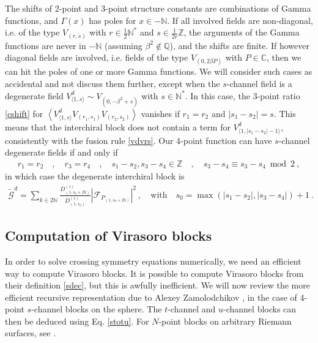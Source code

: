 \documentclass[12pt, a4paper]{article}
\theoremstyle{break}
\begin{document}
The shifts of 2-point and 3-point structure constants are combinations of Gamma functions, and $\Gamma(x)$ has poles for $x\in -\mathbb{N}$.
If all involved fields are non-diagonal, i.e. of the type $V_{(r,s)}$ with $r\in\frac12\mathbb{N}^*$ and $s\in\frac{1}{2r}\mathbb{Z}$, the arguments of the Gamma functions are never in $-\mathbb{N}$ (assuming $\beta^2\notin \mathbb{Q}$), and the shifts are finite. If however diagonal fields are involved, i.e. fields of the type $V_{(0,2\beta P)}$ with $P\in \mathbb{C}$, then we can hit the poles of one or more Gamma functions. We will consider such cases as accidental and not discuss them further, except when the $s$-channel field is a degenerate field $V^d_{\langle 1,s\rangle}\sim V_{(0,-\beta^2+s)}$ with $s\in\mathbb{N}^*$. 
In this case, the 3-point ratio \eqref{cshift} for $\left<V^d_{\langle 1,s\rangle}V_{(r_1,s_1)}V_{(r_2,s_2)}\right>$ vanishes if $r_1=r_2$ and $|s_1-s_2|=s$. This means that the interchiral block does not contain a term for $V^d_{\langle 1,|s_1-s_2|-1\rangle}$, consistently with the fusion rule \eqref{vdvrs}. Our 4-point function can have $s$-channel degenerate fields if and only if 
\begin{align}
 r_1=r_2 \quad , \quad r_3=r_4 \quad , \quad s_1-s_2,s_3-s_4\in \mathbb{Z} \quad , \quad s_3-s_4\equiv s_3-s_4\bmod 2\ , 
\end{align}
in which case the degenerate interchiral block is 
\begin{align}
 \widetilde{\mathcal{G}}^d = \sum_{k\in 2\mathbb{N}} \frac{D^{(s)}_{(1,s_0+2k)}}{D^{(s)}_{(1,s_0)}}\left| \mathcal{F}_{P_{(1,s_0+2k)}} \right|^2\ ,  \quad \text{with} \quad s_0 =  \max(|s_1-s_2|,|s_3-s_4|)+1\ . 
\end{align}

\subsection{Computation of Virasoro blocks}

In order to solve crossing symmetry equations numerically, we need an efficient way to compute Virasoro blocks. It is possible to compute Virasoro blocks from their definition \eqref{sdec}, but this is awfully inefficient. We will now review the more efficient recursive representation due to Alexey Zamolodchikov \cite{zam87b}, in the case of 4-point $s$-channel blocks on the sphere. The $t$-channel and $u$-channel blocks can then be deduced using Eq. \eqref{stotu}. For $N$-point blocks on arbitrary Riemann surfaces, see \cite{ccy17}.
\end{document}
